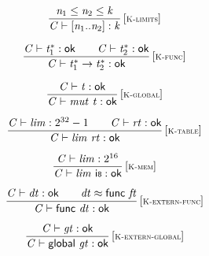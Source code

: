 $$
\begin{array}{@{}c@{}}\displaystyle
\frac{
{\mathit{n}}_{{1}} \leq {\mathit{n}}_{{2}} \leq {\mathit{k}}
}{
{\mathit{C}} \vdash {}[{\mathit{n}}_{{1}} .. {\mathit{n}}_{{2}}] : {\mathit{k}}
} \, {[\textsc{\scriptsize K{-}limits}]}
\qquad
\end{array}
$$

$$
\begin{array}{@{}c@{}}\displaystyle
\frac{
{\mathit{C}} \vdash {{\mathit{t}}_{{1}}^\ast} : \mathsf{ok}
 \qquad
{\mathit{C}} \vdash {{\mathit{t}}_{{2}}^\ast} : \mathsf{ok}
}{
{\mathit{C}} \vdash {{\mathit{t}}_{{1}}^\ast} \rightarrow {{\mathit{t}}_{{2}}^\ast} : \mathsf{ok}
} \, {[\textsc{\scriptsize K{-}func}]}
\qquad
\end{array}
$$

$$
\begin{array}{@{}c@{}}\displaystyle
\frac{
{\mathit{C}} \vdash {\mathit{t}} : \mathsf{ok}
}{
{\mathit{C}} \vdash {\mathit{mut}}~{\mathit{t}} : \mathsf{ok}
} \, {[\textsc{\scriptsize K{-}global}]}
\qquad
\end{array}
$$

$$
\begin{array}{@{}c@{}}\displaystyle
\frac{
{\mathit{C}} \vdash {\mathit{lim}} : {2^{32}} - 1
 \qquad
{\mathit{C}} \vdash {\mathit{rt}} : \mathsf{ok}
}{
{\mathit{C}} \vdash {\mathit{lim}}~{\mathit{rt}} : \mathsf{ok}
} \, {[\textsc{\scriptsize K{-}table}]}
\qquad
\end{array}
$$

$$
\begin{array}{@{}c@{}}\displaystyle
\frac{
{\mathit{C}} \vdash {\mathit{lim}} : {2^{16}}
}{
{\mathit{C}} \vdash {\mathit{lim}}~\mathsf{i{\scriptstyle8}} : \mathsf{ok}
} \, {[\textsc{\scriptsize K{-}mem}]}
\qquad
\end{array}
$$

\vspace{1ex}

$$
\begin{array}{@{}c@{}}\displaystyle
\frac{
{\mathit{C}} \vdash {\mathit{dt}} : \mathsf{ok}
 \qquad
{\mathit{dt}} \approx \mathsf{func}~{\mathit{ft}}
}{
{\mathit{C}} \vdash \mathsf{func}~{\mathit{dt}} : \mathsf{ok}
} \, {[\textsc{\scriptsize K{-}extern{-}func}]}
\qquad
\end{array}
$$

$$
\begin{array}{@{}c@{}}\displaystyle
\frac{
{\mathit{C}} \vdash {\mathit{gt}} : \mathsf{ok}
}{
{\mathit{C}} \vdash \mathsf{global}~{\mathit{gt}} : \mathsf{ok}
} \, {[\textsc{\scriptsize K{-}extern{-}global}]}
\qquad
\end{array}
$$

